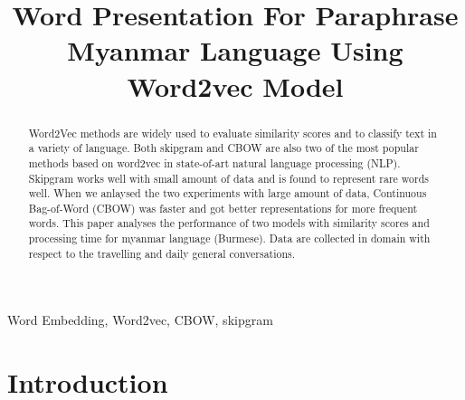 \documentclass[conference]{IEEEtran}
\begin{document}
\title{Word Presentation For Paraphrase Myanmar Language Using Word2vec Model}

\author{
\and
{}
\and
{}
\and
{}
}

\maketitle

\begin{abstract}
Word2Vec methods are widely used to evaluate similarity scores and to classify text in a variety of language. Both skipgram and CBOW are also two of the most popular methods based on word2vec in state-of-art natural language processing (NLP). Skipgram works well with small amount of data and is found to represent rare words well. When we anlaysed the two experiments with large amount of data, Continuous Bag-of-Word (CBOW) was faster and got better representations for more frequent words. This paper analyses the performance of two models with similarity scores and processing time for myanmar language (Burmese).  Data are collected  in domain with respect to the travelling and daily general conversations.\end{abstract}

\begin{IEEEkeywords}
Word Embedding, Word2vec, CBOW, skipgram
\end{IEEEkeywords}

\section{Introduction}
\label{Sec:introduction}
\end{document}
